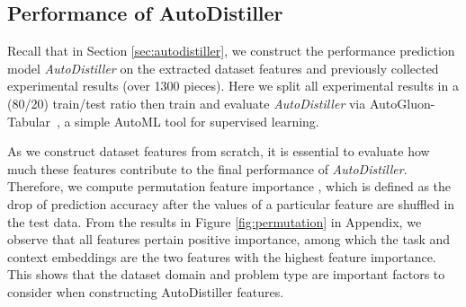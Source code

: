 \documentclass[11pt]{article}
\begin{document}
\subsection{Performance of AutoDistiller}


Recall that in Section \ref{sec:autodistiller}, we construct the performance prediction model \emph{AutoDistiller} on the extracted dataset features and previously collected experimental results (over 1300 pieces). Here we split all experimental results in a (80/20) train/test ratio then train and evaluate \emph{AutoDistiller} via AutoGluon-Tabular~\citep{erickson2020autogluon}, a simple AutoML tool for supervised learning. 

As we construct dataset features from scratch, it is essential to evaluate how much these features contribute to the final performance of \emph{AutoDistiller}. Therefore, we compute permutation feature importance \citep{breiman2001random}, which is defined as the drop of prediction accuracy after the values of a particular feature are shuffled in the test data. From the results in Figure \ref{fig:permutation} in Appendix, we observe that all features pertain positive importance, among which the task and context embeddings are the two features with the highest feature importance. This shows that the dataset domain and problem type are important factors to consider when constructing AutoDistiller features.
\end{document}
